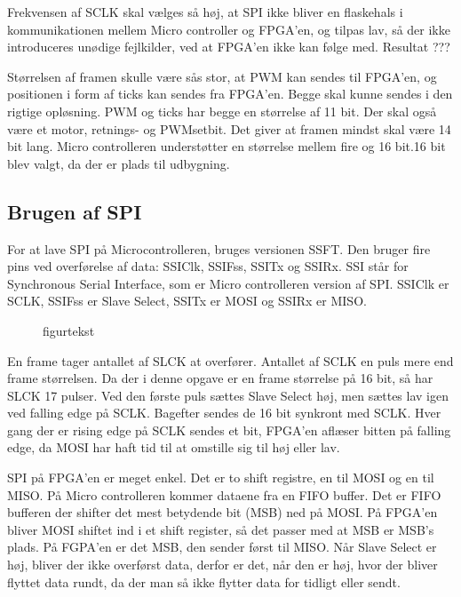 Frekvensen af SCLK skal vælges så høj, at SPI ikke bliver en flaskehals i kommunikationen mellem Micro controller og FPGA’en, og tilpas lav, så der ikke introduceres unødige fejlkilder, ved at FPGA’en ikke kan følge med. Resultat ???


Størrelsen af framen skulle være sås stor, at PWM kan sendes til FPGA’en, og positionen i form af ticks kan sendes fra FPGA’en. Begge skal kunne sendes i den rigtige opløsning. PWM og ticks har begge en størrelse af 11 bit. Der skal også være et motor, retnings- og PWMsetbit. Det giver at framen mindst skal være 14 bit lang. Micro controlleren understøtter en størrelse mellem fire og 16 bit.16 bit blev valgt, da der er plads til udbygning.



\subsection{Brugen af SPI}

For at lave SPI på Microcontrolleren, bruges versionen SSFT. Den bruger fire pins ved overførelse af data: SSIClk, SSIFss, SSITx og SSIRx. SSI står for Synchronous Serial Interface, som er Micro controlleren version af SPI. SSIClk er SCLK, SSIFss er Slave Select, SSITx er MOSI og SSIRx er MISO.

\begin{figure}[!th]
\centering
\begin{tikzpicture}[scale=1]

\end{tikzpicture}
\caption[tekst i indholdsfortegnelsen]{figurtekst}
\label{fig:}
\end{figure}

En frame tager antallet af SLCK at overfører. Antallet af SCLK en puls mere end frame størrelsen. Da der i denne opgave er en frame størrelse på 16 bit, så har SLCK 17 pulser. Ved den første puls sættes Slave Select høj, men sættes lav igen ved falling edge på SCLK. Bagefter sendes de 16 bit synkront med SCLK. Hver gang der er rising edge på SCLK sendes et bit, FPGA’en aflæser bitten på falling edge, da MOSI har haft tid til at omstille sig til høj eller lav.

SPI på FPGA’en er meget enkel. Det er to shift registre, en til MOSI og en til MISO. På Micro controlleren kommer dataene fra en FIFO buffer. Det er FIFO bufferen der shifter det mest betydende bit (MSB) ned på MOSI. På FPGA’en bliver MOSI shiftet ind i et shift register, så det passer med at MSB er MSB’s plads. På FGPA’en er det MSB, den sender først til MISO. Når Slave Select er høj, bliver der ikke overførst data, derfor er det, når den er høj, hvor der bliver flyttet data rundt, da der man så ikke flytter data for tidligt eller sendt. 

